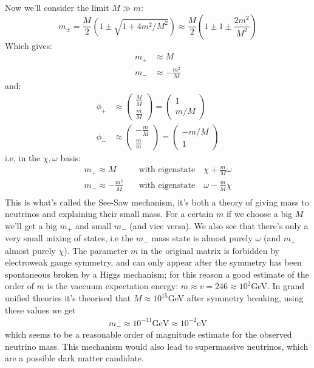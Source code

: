 \documentclass[11pt,a4paper,faculty=we,language=en,doctype=report]{cls/ugent-doc}
\begin{document}
Now we'll consider the limit $M \gg m$:
\begin{equation}
	m_\pm =  \frac{M}{2}\left( 1 \pm \sqrt{1 + 4m^2/M^2}\right) \approx \frac{M}{2}\left(1\pm1\pm\frac{2m^2}{M^2}\right)
\end{equation}
Which gives:
\begin{align}
	m_+ &\approx M\\
	m_- &\approx -\frac{m^2}{M}
\end{align}
and:
\begin{align}
	\phi_+&\approx \left(\begin{array}{c}
		\frac{M}{M}\\
		\frac{m}{M}
	\end{array}\right) = \left(\begin{array}{c}
	1\\
	m/M
	\end{array}\right)\\
	\phi_-&\approx \left(\begin{array}{c}
		-\frac{m}{M}\\
		\frac{m}{m}
	\end{array}\right) = \left(\begin{array}{c}
		-m/M\\
		1
	\end{array}\right)
\end{align}
i.e, in the $\chi,\omega$ basis:
\begin{align}
	m_+\approx M \quad &\text{with eigenstate} \quad \chi + \frac{m}{M}\omega\\
	m_-\approx -\frac{m^2}{M} \quad &\text{with eigenstate} \quad  \omega - \frac{m}{M}\chi\\
\end{align}
This is what's called the See-Saw mechanism, it's both a theory of giving mass to
neutrinos and explaining their small mass.  
For a certain $m$ if we choose a big $M$ we'll
get a big $m_+$ and small $m_-$ (and vice versa). We also see that there's only
a very small mixing of states, i.e the $m_-$ mass state is almost purely
$\omega$ (and $m_+$ almost purely $\chi$). The parameter $m$ in the original
matrix is forbidden by electroweak gauge symmetry, and can only appear after
the symmetry has been spontaneous broken by a Higgs mechanism; for this reason
a good estimate of the order of $m$ is the vaccuum expectation energy:
$m\approx v = 246 \approx 10^2$GeV. In grand unified theories it's theorised
that $M\approx 10^{15}$GeV after symmetry breaking, using these values we get
\begin{align}
	m_- \approx 10^{-11}\text{GeV} \approx 10^{-2} \text{eV}
\end{align}
which seems \cite{neutrino-mass} to be a reasonable order of magnitude estimate for the observed neutrino
mass.
This mechanism would also lead to supermassive neutrinos, which are a possible dark matter
candidate.
\end{document}
